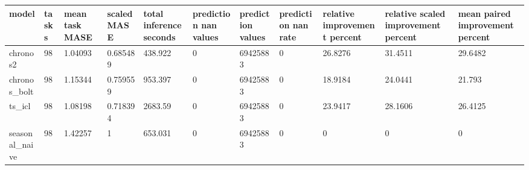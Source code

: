 \begin{tabular}{lllllllllll}
\toprule
model & tasks & mean task MASE & scaled MASE & total inference seconds & prediction nan values & prediction values & prediction nan rate & relative improvement percent & relative scaled improvement percent & mean paired improvement percent \\
\midrule
chronos2 & 98 & 1.04093 & 0.685489 & 438.922 & 0 & 69425883 & 0 & 26.8276 & 31.4511 & 29.6482 \\
chronos\_bolt & 98 & 1.15344 & 0.759559 & 953.397 & 0 & 69425883 & 0 & 18.9184 & 24.0441 & 21.793 \\
ts\_icl & 98 & 1.08198 & 0.718394 & 2683.59 & 0 & 69425883 & 0 & 23.9417 & 28.1606 & 26.4125 \\
seasonal\_naive & 98 & 1.42257 & 1 & 653.031 & 0 & 69425883 & 0 & 0 & 0 & 0 \\
\bottomrule
\end{tabular}
